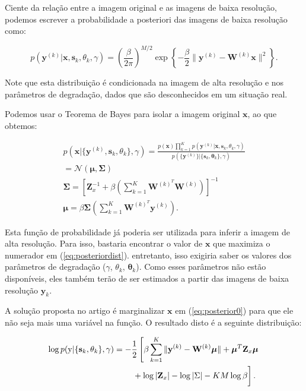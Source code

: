 \documentclass[12pt,openright,oneside,a4paper,english,brazil]{abntex2}
\begin{document}
Ciente da relação entre a imagem original e as imagens de baixa resolução, podemos escrever a probabilidade a posteriori das imagens de baixa resolução como:

\begin{equation}
	\label{eq:posterior0}
	p(\mathbf{y}^{(k)} | \mathbf{x}, \mathbf{s}_k, \theta_k, \gamma) = 
	\left(\frac{\beta}{2\pi}\right)^{M/2}
	\exp \left\{ -\frac{\beta}{2} \| \mathbf{y}^{(k)} - \mathbf{W}^{(k)} \mathbf{x} \|^2 \right\}.
\end{equation}

Note que esta distribuição é condicionada na imagem de alta resolução e nos parâmetros de degradação, dados que são desconhecidos em um situação real.

Podemos usar o Teorema de Bayes para isolar a imagem original $\mathbf{x}$, ao que obtemos:

\begin{gather}
	\label{eq:posteriordist}
	p(\mathbf{x}|\{\mathbf{y}^{(k)},\mathbf{s}_k,\theta_k\}, \gamma) = 
	\frac{p(\mathbf{x})\prod^K_{k=1} p(\mathbf{y}^{(k)}|\mathbf{x},\mathbf{s}_k,\theta_k, \gamma)}
	{p(\{\mathbf{y}^{(k)}\}|\{\mathbf{s}_k,\mathbf{\theta}_k\},\gamma)} \\
	= \mathcal{N}(\boldsymbol{\mu},\mathbf{\Sigma}) \\
	\mathbf{ \Sigma }= \left[\mathbf{Z}^{-1}_x + \beta \left( \sum^K_{k = 1} \mathbf{W}^{(k)^T} \mathbf{W}^{(k)} \right) \right]^{-1} \\
	\boldsymbol{\mu} = \beta \mathbf{ \Sigma } \left( \sum^K_{k=1} \mathbf{W}^{(k)^T}\mathbf{y}^{(k)} \right).
\end{gather}

Esta função de probabilidade já poderia ser utilizada para inferir a imagem de alta resolução.
Para isso, bastaria encontrar o valor de $\mathbf{x}$ que maximiza o numerador em (\ref{eq:posteriordist}). entretanto, isso exigiria saber os valores dos parâmetros de degradação ($\gamma$, $\theta_k$, $\mathbf{\theta}_k$).
Como esses parâmetros não estão disponíveis, eles também terão de ser estimados a partir das imagens de baixa resolução $\mathbf{y}_k$. 

A solução proposta no artigo é marginalizar $\mathbf{x}$ em (\ref{eq:posterior0}) para que ele não seja mais uma variável na função. O resultado disto é a seguinte distribuição:

\begin{align}
	\label{eq:parameter}
	\log p(\mathrm{y}|\{\mathbf{s}_k,\theta_k\}, \gamma) &= -\frac{1}{2}\left[\beta \sum^K_{k=1} \|\mathbf{y}^{(k)} - \mathbf{W}^{(k)}\boldsymbol{\mu}\|
    + \boldsymbol{\mu}^T\mathbf{Z}_x \boldsymbol{\mu} \right. \nonumber \\
    &\qquad \left.\vphantom{\int_t} + \log |\mathbf{Z}_x| - \log{|\Sigma |} - KM \log \beta \right].
\end{align}
\end{document}
